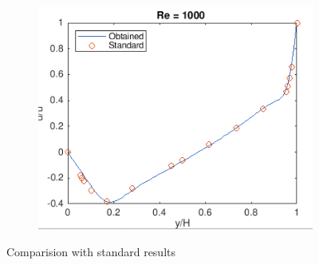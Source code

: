 \documentclass{article}
\begin{document}
\begin{figure}
\begin{subfigure}[b]{0.3\textwidth}
    \includegraphics[width=\textwidth]{33.png}
  \end{subfigure}
      \caption{Comparision with standard results}
\label{fig:res5s}
\end{figure}
\end{document}
